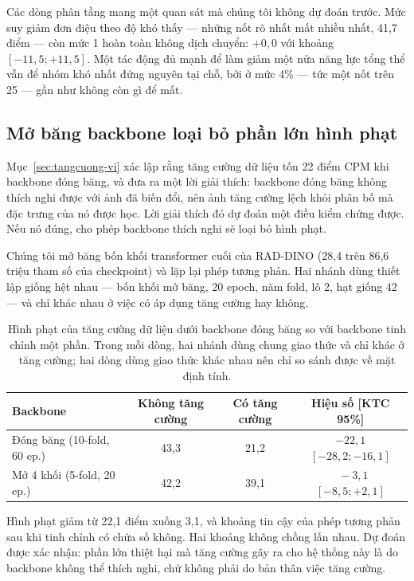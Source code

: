 \documentclass[12pt,a4paper]{article}
\begin{document}
Các dòng phân tầng mang một quan sát mà chúng tôi không dự đoán trước. Mức suy
giảm đơn điệu theo độ khó thấy --- những nốt rõ nhất mất nhiều nhất, 41,7 điểm
--- còn mức 1 hoàn toàn không dịch chuyển: $+0{,}0$ với khoảng
$[-11{,}5; +11{,}5]$. Một tác động đủ mạnh để làm giảm một nửa năng lực tổng thể
vẫn để nhóm khó nhất đứng nguyên tại chỗ, bởi ở mức 4\% --- tức một nốt trên 25
--- gần như không còn gì để mất.

\subsection{Mở băng backbone loại bỏ phần lớn hình phạt}
\label{sec:tinhchinh-vi}

Mục~\ref{sec:tangcuong-vi} xác lập rằng tăng cường dữ liệu tốn 22 điểm CPM khi
backbone đóng băng, và đưa ra một lời giải thích: backbone đóng băng không thích
nghi được với ảnh đã biến đổi, nên ảnh tăng cường lệch khỏi phân bố mà đặc trưng
của nó được học. Lời giải thích đó dự đoán một điều kiểm chứng được. Nếu nó đúng,
cho phép backbone thích nghi sẽ loại bỏ hình phạt.

Chúng tôi mở băng bốn khối transformer cuối của RAD-DINO (28,4 trên 86,6 triệu
tham số của checkpoint) và lặp lại phép tương phản. Hai nhánh dùng thiết lập giống
hệt nhau --- bốn khối mở băng, 20 epoch, năm fold, lô 2, hạt giống 42 --- và chỉ
khác nhau ở việc có áp dụng tăng cường hay không.

\begin{table}[t]
\centering
\caption{Hình phạt của tăng cường dữ liệu dưới backbone đóng băng so với backbone
tinh chỉnh một phần. Trong mỗi dòng, hai nhánh dùng chung giao thức và chỉ khác ở
tăng cường; hai dòng dùng giao thức khác nhau nên chỉ so sánh được về mặt định
tính.}
\label{tab:tinhchinh-vi}
\begin{tabular}{lccc}
\toprule
Backbone & Không tăng cường & Có tăng cường & Hiệu số [KTC 95\%] \\
\midrule
Đóng băng (10-fold, 60 ep.)       & 43,3 & 21,2 & $-22{,}1$ $[-28{,}2; -16{,}1]$ \\
Mở 4 khối (5-fold, 20 ep.)        & 42,2 & 39,1 & $\phantom{0}-3{,}1$ $[-8{,}5; +2{,}1]$ \\
\bottomrule
\end{tabular}
\end{table}

Hình phạt giảm từ 22,1 điểm xuống 3,1, và khoảng tin cậy của phép tương phản sau
khi tinh chỉnh có chứa số không. Hai khoảng không chồng lấn nhau. Dự đoán được
xác nhận: phần lớn thiệt hại mà tăng cường gây ra cho hệ thống này là do backbone
không thể thích nghi, chứ không phải do bản thân việc tăng cường.
\end{document}
